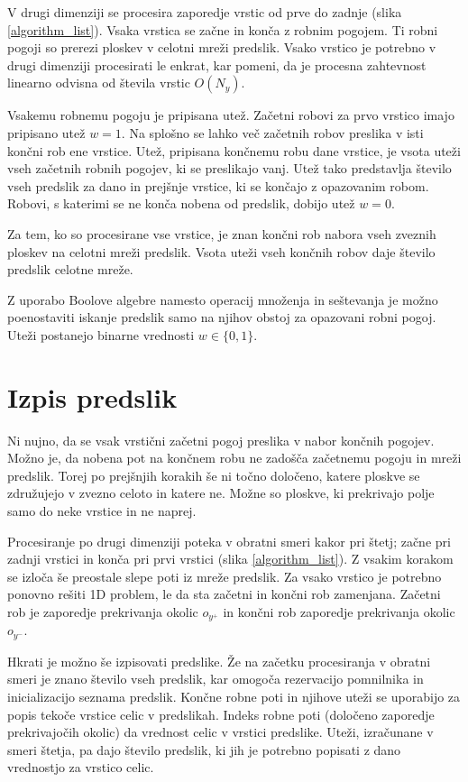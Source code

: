 \documentclass[12pt,a4paper,openany,twoside]{book}
\begin{document}
V drugi dimenziji se procesira zaporedje vrstic od prve do zadnje (slika \ref{algorithm_list}).
Vsaka vrstica se začne in konča z robnim pogojem.
Ti robni pogoji so prerezi ploskev v celotni mreži predslik.
Vsako vrstico je potrebno v drugi dimenziji procesirati le enkrat, kar pomeni,
da je procesna zahtevnost linearno odvisna od števila vrstic \(O(N_y)\).

Vsakemu robnemu pogoju je pripisana utež. Začetni robovi za prvo vrstico imajo pripisano utež \(w=1\).
Na splošno se lahko več začetnih robov preslika v isti končni rob ene vrstice.
Utež, pripisana končnemu robu dane vrstice, je vsota uteži vseh začetnih robnih pogojev, ki se preslikajo vanj.
Utež tako predstavlja število vseh predslik za dano in prejšnje vrstice, ki se končajo z opazovanim robom.
Robovi, s katerimi se ne konča nobena od predslik, dobijo utež \(w=0\).

Za tem, ko so procesirane vse vrstice, je znan končni rob nabora vseh zveznih ploskev na celotni mreži predslik.
Vsota uteži vseh končnih robov daje število predslik celotne mreže.

Z uporabo Boolove algebre namesto operacij množenja in seštevanja
je možno poenostaviti iskanje predslik samo na njihov obstoj za opazovani robni pogoj.
Uteži postanejo binarne vrednosti \(w \in \{0, 1\}\).

\section{Izpis predslik}

Ni nujno, da se vsak vrstični začetni pogoj preslika v nabor končnih pogojev.
Možno je, da nobena pot na končnem robu ne zadošča začetnemu pogoju in mreži predslik.
Torej po prejšnjih korakih še ni točno določeno, katere ploskve se združujejo v zvezno
celoto in katere ne. Možne so ploskve, ki prekrivajo polje samo do neke vrstice in ne naprej.

Procesiranje po drugi dimenziji poteka v obratni smeri kakor pri štetj;
začne pri zadnji vrstici in konča pri prvi vrstici (slika \ref{algorithm_list}).
Z vsakim korakom se izloča še preostale slepe poti iz mreže predslik.
Za vsako vrstico je potrebno ponovno rešiti 1D problem,
le da sta začetni in končni rob zamenjana.
Začetni rob je zaporedje prekrivanja okolic \(o_{y^+}\)
in končni rob zaporedje prekrivanja okolic \(o_{y^-}\).

Hkrati je možno še izpisovati predslike. Že na začetku procesiranja v obratni smeri
je znano število vseh predslik, kar omogoča rezervacijo pomnilnika in inicializacijo seznama predslik.
Končne robne poti in njihove uteži se uporabijo za popis tekoče vrstice celic v predslikah.
Indeks robne poti (določeno zaporedje prekrivajočih okolic) da vrednost celic v vrstici predslike.
Uteži, izračunane v smeri štetja, pa dajo število predslik,
ki jih je potrebno popisati z dano vrednostjo za vrstico celic.
\end{document}
